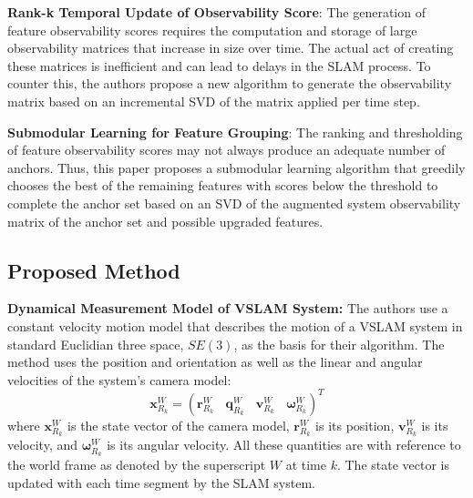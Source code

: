 \documentclass[10pt,twocolumn,letterpaper]{article}
\begin{document}
\textbf{Rank-k Temporal Update of Observability Score}: The generation of feature observability 
scores requires 
the computation and storage of large observability matrices that increase in size over time. 
The actual act of creating these matrices is inefficient and can lead to delays 
in the SLAM process. To counter this, the authors propose a new algorithm to generate the 
observability matrix 
based on an incremental SVD of the matrix applied per time step.

\textbf{Submodular Learning for Feature Grouping}: The ranking and thresholding of feature 
observability scores may not 
always produce an adequate number of anchors. 
Thus, this paper proposes a submodular learning algorithm that 
greedily chooses the best of the remaining features with scores 
below the threshold to complete the anchor set based on an 
SVD of the augmented system observability matrix of the anchor set and possible upgraded features. 

\subsection{Proposed Method}
\textbf{Dynamical Measurement Model of VSLAM System:}
The authors use a constant velocity motion model that describes the motion of a VSLAM system in standard 
Euclidian three space, 
$SE(3)$, as the basis for their algorithm. The method uses the position and orientation as well as the linear 
and angular velocities of the system's camera model: 
\begin{equation} \label{eq:stateVector}
\boldsymbol{x}_{R_k}^W = (\boldsymbol{r}_{R_k}^W \ \ \ \  \boldsymbol{q}_{R_k}^W  \ \ \ \  \boldsymbol{v}_{R_k}^W  \ \ \ \  \boldsymbol{\omega}_{R_k}^W)^T
\end{equation}
where $\boldsymbol{x}_{R_k}^W$ is the state vector of the camera model, 
$\boldsymbol{r}_{R_k}^W$ is its position, 
$\boldsymbol{v}_{R_k}^W$ is its velocity, 
and $\boldsymbol{\omega}_{R_k}^W$ is its angular velocity. All these quantities are with reference to the world frame as denoted by the superscript $W$ at time $k$. 
The state vector is updated with each time segment by the SLAM system. 
\end{document}
